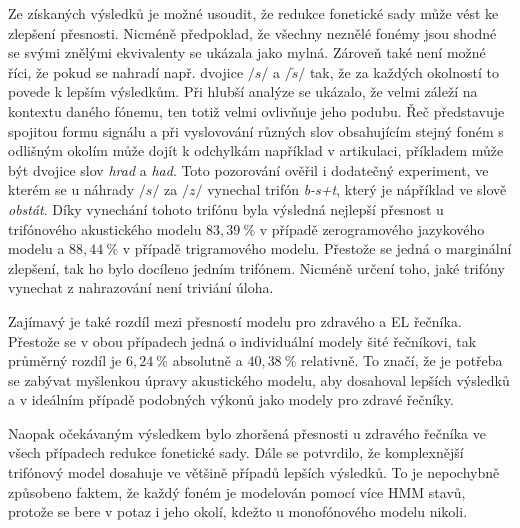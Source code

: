 Ze získaných výsledků je možné usoudit, že redukce fonetické sady může vést ke zlepšení přesnosti. Nicméně předpoklad, že všechny neznělé fonémy jsou shodné se svými znělými ekvivalenty se ukázala jako mylná. Zároveň také není možné říci, že pokud se nahradí např. dvojice $/s/$ a $/\check{s}/$ tak, že za každých okolností to povede k lepším výsledkům. Při hlubší analýze se ukázalo, že velmi záleží na kontextu daného fónemu, ten totiž velmi ovlivňuje jeho podubu. Řeč představuje spojitou formu signálu a při vyslovování různých slov obsahujícím stejný foném s odlišným okolím  může dojít k odchylkám například v artikulaci, příkladem může být dvojice slov \textit{hrad} a \textit{had}. Toto pozorování ověřil i dodatečný experiment, ve kterém se u náhrady $/s/$ za $/z/$ vynechal trifón \textit{b-s+t}, který je nápříklad ve slově \textit{obstát}. Díky vynechání tohoto trifónu byla výsledná nejlepší přesnost u trifónového akustického modelu $83,39\ \%$ v případě zerogramového jazykového modelu a $88,44\ \%$ v případě trigramového modelu. Přestože se jedná o marginální zlepšení, tak ho bylo docíleno jedním trifónem. Nicméně určení toho,  jaké trifóny vynechat z nahrazování není triviání úloha.

Zajímavý je také rozdíl mezi přesností modelu pro zdravého a EL řečníka. Přestože se v obou případech jedná o individuální modely šité  řečníkovi, tak průměrný rozdíl je $6,24\ \%$ absolutně a $40,38\ \%$ relativně. To značí, že je potřeba se zabývat myšlenkou úpravy akustického modelu, aby dosahoval lepších výsledků a v ideálním případě podobných výkonů jako modely pro zdravé řečníky.

Naopak očekávaným výsledkem bylo zhoršená přesnosti u zdravého řečníka ve všech případech redukce fonetické sady. Dále se potvrdilo, že komplexnější trifónový model dosahuje ve většině případů lepších výsledků. To je nepochybně způsobeno faktem, že každý foném je modelován pomocí více HMM stavů, protože se bere v potaz i jeho okolí, kdežto u monofónového modelu nikoli.
